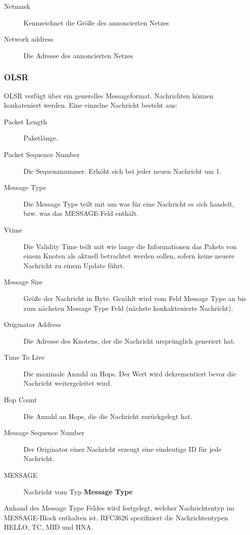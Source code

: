 \documentclass[a4paper,10pt]{article}
\begin{document}
\begin{description}
  \item[Netmask] Kennzeichnet die Größe des annoncierten Netzes
  \item[Network address] Die Adresse des annoncierten Netzes
\end{description}


\subsubsection*{OLSR}

OLSR verfügt über ein generelles Messageformat.
Nachrichten können konkateniert werden.
Eine einzelne Nachricht besteht aus:

\begin{description}
  \item[Packet Length] Paketlänge.
  \item[Packet Sequence Number] Die Sequenznummer. Erhöht sich bei jeder neuen Nachricht um 1. 
  \item[Message Type] Die Message Type teilt mit um was für eine Nachricht es sich handelt, bzw. was das MESSAGE-Feld enthält.
  \item[Vtime] Die Validity Time teilt mit wie lange die Informationen das Pakets von einem Knoten als aktuell betrachtet werden sollen, sofern keine neuere Nachricht zu einem Update führt.
  \item[Message Size] Größe der Nachricht in Byte. Gezählt wird vom Feld Message Type an bis zum nächsten Message Type Feld (nächste konkaktenierte Nachricht).
  \item[Originator Address] Die Adresse des Knotens, der die Nachricht ursprünglich generiert hat.
  \item[Time To Live] Die maximale Anzahl an Hops. Der Wert wird dekrementiert bevor die Nachricht weitergeleitet wird.
  \item[Hop Count] Die Anzahl an Hops, die die Nachricht zurückgelegt hat.
  \item[Message Sequence Number] Der Originator einer Nachricht erzeugt eine eindeutige ID für jede Nachricht.
  \item[MESSAGE] Nachricht vom Typ \textbf{Message Type}
\end{description}

Anhand des Message Type Feldes wird festgelegt, welcher Nachrichtentyp im MESSAGE-Block enthalten ist. 
RFC3626 spezifiziert die Nachrichtentypen HELLO, TC, MID und HNA.
\end{document}
